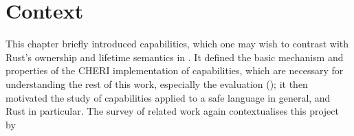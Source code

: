 \documentclass[dissertation.tex]{subfiles}
\begin{document}
\section{Context}
This chapter briefly introduced capabilities, which one may wish to
contrast with Rust's ownership and lifetime semantics in
.
It defined the basic mechanism and properties of the CHERI
implementation of capabilities, which are necessary for understanding
the rest of this work, especially the evaluation ();
it then motivated the study of capabilities applied to a safe language
in general, and Rust in particular.
The survey of related work again contextualises this project by 
\end{document}
